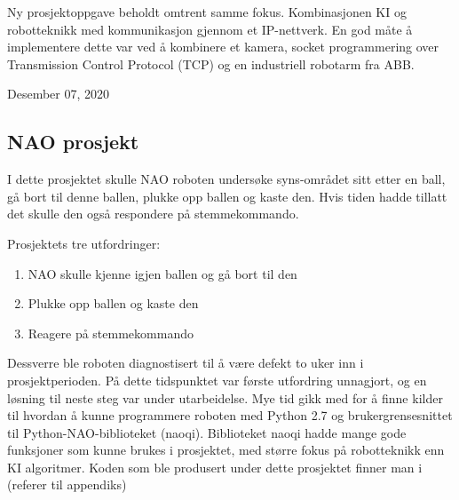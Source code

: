 \documentclass[conference]{IEEEtran}
\begin{document}
Ny prosjektoppgave beholdt omtrent samme fokus. Kombinasjonen KI og robotteknikk med kommunikasjon gjennom et IP-nettverk. En god måte å implementere 
dette var ved å kombinere et kamera, socket programmering over Transmission Control Protocol  (TCP) og en industriell robotarm fra ABB.
 
\hfill Desember 07, 2020

    \subsection{NAO prosjekt}
        I dette prosjektet skulle NAO roboten undersøke syns-området sitt etter en ball, gå bort til denne ballen, plukke opp ballen og kaste 
        den. Hvis tiden hadde tillatt det skulle den også respondere på stemmekommando. 

        Prosjektets tre utfordringer:
        \begin{enumerate}
            \item NAO skulle kjenne igjen ballen og gå bort til den
            \item Plukke opp ballen og kaste den
            \item Reagere på stemmekommando 
        \end{enumerate}
        
        Dessverre ble roboten diagnostisert til å være defekt to uker inn i prosjektperioden. På dette tidspunktet var første utfordring unnagjort, 
        og en løsning til neste steg var under utarbeidelse. Mye tid gikk med for å finne kilder til hvordan å kunne programmere roboten med Python 2.7 
        og brukergrensesnittet til Python-NAO-biblioteket (naoqi). Biblioteket naoqi hadde mange gode funksjoner som kunne brukes i prosjektet, med 
        større fokus på robotteknikk enn KI algoritmer. Koden som ble produsert under dette prosjektet finner man i (referer til appendiks)
\end{document}
